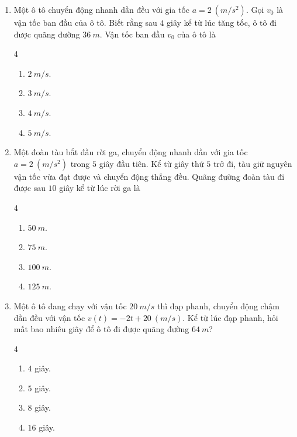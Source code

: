 \documentclass[12pt]{article}
\begin{document}
\begin{enumerate}[label=\textbf{Câu \arabic*.}]
		\item Một ô tô chuyển động nhanh dần đều với gia tốc $a = 2 \ (m/s^2)$. Gọi $v_0$ là vận tốc ban đầu của ô tô. Biết rằng sau $4$ giây kể từ lúc tăng tốc, ô tô đi được quãng đường $36 \ m$. Vận tốc ban đầu $v_0$ của ô tô là
		\begin{multicols}{4}
			\begin{enumerate}[label=\textbf{\Alph*.}]
				\item $2 \ m/s$.
				\item $3 \ m/s$.
				\item $4 \ m/s$.
				\item $5 \ m/s$.
			\end{enumerate}
		\end{multicols}
		
		\item Một đoàn tàu bắt đầu rời ga, chuyển động nhanh dần với gia tốc $a = 2 \ (m/s^2)$ trong $5$ giây đầu tiên. Kể từ giây thứ $5$ trở đi, tàu giữ nguyên vận tốc vừa đạt được và chuyển động thẳng đều. Quãng đường đoàn tàu đi được sau $10$ giây kể từ lúc rời ga là
		\begin{multicols}{4}
			\begin{enumerate}[label=\textbf{\Alph*.}]
				\item $50 \ m$.
				\item $75 \ m$.
				\item $100 \ m$.
				\item $125 \ m$.
			\end{enumerate}
		\end{multicols}
		
		\item Một ô tô đang chạy với vận tốc $20 \ m/s$ thì đạp phanh, chuyển động chậm dần đều với vận tốc $v(t) = -2t + 20 \ (m/s)$. Kể từ lúc đạp phanh, hỏi mất bao nhiêu giây để ô tô đi được quãng đường $64 \ m$?
		\begin{multicols}{4}
			\begin{enumerate}[label=\textbf{\Alph*.}]
				\item $4$ giây.
				\item $5$ giây.
				\item $8$ giây.
				\item $16$ giây.
			\end{enumerate}
		\end{multicols}
		

\end{enumerate}
\end{document}
